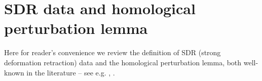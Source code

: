\documentclass[11pt,a4paper]{amsart}
\theoremstyle{plain} %
\newtheorem{thm}{Theorem}[section]
\newtheorem{lem}[thm]{Lemma}
\newtheorem{cor}[thm]{Corollary}
\theoremstyle{definition}
\theoremstyle{remark}
\newcommand{\mr}{\mathrm}
\newcommand{\M}{\mathcal{M}}
\newcommand{\irr}{\mathrm{irr}}
\newcommand{\sm}{\mathrm{sm}}
\begin{document}





\appendix



\section{SDR data and homological perturbation lemma}\label{app: SDR}
Here for reader's convenience we review the definition of SDR (strong deformation retraction)  data and the homological perturbation lemma, both well-known in the literature -- see e.g. \cite{gugenheim1989perturbation}, \cite{Crainic2004}.
\end{document}
